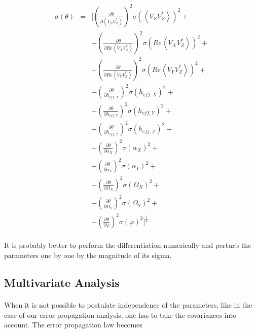 \documentclass[a4paper,10pt]{thesis}
\begin{document}
\begin{eqnarray}
\sigma (\theta) &=&  [(\frac{\partial \theta}{\partial \left\langle V_Z V_Z^{*}\right\rangle})^2 \sigma ( \left\langle V_Z V_Z^{*}\right\rangle)^2+\\
&&+ (\frac{\partial \theta}{\partial Re \left\langle V_X V_Z^{*}\right\rangle})^2 \sigma (Re \left\langle V_X V_Z^{*}\right\rangle)^2+ \nonumber \\
&&+ (\frac{\partial \theta}{\partial Re \left\langle V_Y V_Z^{*}\right\rangle})^2 \sigma (Re \left\langle V_Y V_Z^{*}\right\rangle)^2+ \nonumber \\
&&+ (\frac{\partial \theta}{\partial h_{eff,X}})^2 \sigma (h_{eff,X})^2+ \nonumber \\
&&+ (\frac{\partial \theta}{\partial h_{eff,Y}})^2 \sigma (h_{eff,Y})^2+ \nonumber \\
&&+ (\frac{\partial \theta}{\partial h_{eff,Z}})^2 \sigma (h_{eff,Z})^2+ \nonumber \\
&&+ (\frac{\partial \theta}{\partial \alpha_X})^2 \sigma (\alpha_X)^2+ \nonumber \\
&&+ (\frac{\partial \theta}{\partial \alpha_Y})^2 \sigma (\alpha_Y)^2+ \nonumber \\
&&+ (\frac{\partial \theta}{\partial \Omega_X})^2 \sigma (\Omega_X)^2+ \nonumber \\
&&+ (\frac{\partial \theta}{\partial \Omega_Y})^2 \sigma (\Omega_Y)^2+ \nonumber \\
&&+ (\frac{\partial \theta}{\partial \varphi})^2 \sigma (\varphi)^2 ]^\frac{1}{2}\nonumber
\end{eqnarray}

\paragraph*{}
It is probably better to perform the differentiation numerically and perturb the parameters one by one by the magnitude of its sigma.

\subsection{Multivariate Analysis}\label{susec_multivariat}
\paragraph*{}
When it is not possible to postulate independence of the parameters, like in the case of our error propagation analysis, one has to take the covariances into account. The error propagation law becomes
\end{document}
